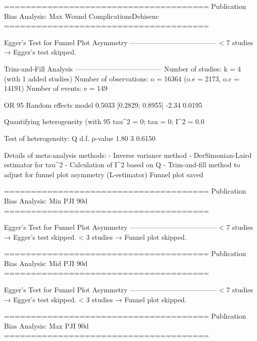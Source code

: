 ======================================
Publication Bias Analysis: Max Wound ComplicationsDehisenc 
======================================
                                                                                                                                                        
Egger's Test for Funnel Plot Asymmetry
--------------------------------------
  < 7 studies → Egger’s test skipped.

Trim-and-Fill Analysis
--------------------------------------
Number of studies: k = 4 (with 1 added studies)
Number of observations: o = 16364 (o.e = 2173, o.c = 14191)
Number of events: e = 149

                         OR           95%
Random effects model 0.5033 [0.2829; 0.8955] -2.34  0.0195

Quantifying heterogeneity (with 95%
 tau^2 = 0; tau = 0; I^2 = 0.0%

Test of heterogeneity:
    Q d.f. p-value
 1.80    3  0.6150

Details of meta-analysis methods:
- Inverse variance method
- DerSimonian-Laird estimator for tau^2
- Calculation of I^2 based on Q
- Trim-and-fill method to adjust for funnel plot asymmetry (L-estimator)
  Funnel plot saved
  
  
======================================
Publication Bias Analysis: Min PJI 90d 
======================================
                                                                                                                                                        
Egger's Test for Funnel Plot Asymmetry
--------------------------------------
  < 7 studies → Egger’s test skipped.
  < 3 studies → Funnel plot skipped.

======================================
Publication Bias Analysis: Mid PJI 90d 
======================================
                                                                                                                                                        
Egger's Test for Funnel Plot Asymmetry
--------------------------------------
  < 7 studies → Egger’s test skipped.
  < 3 studies → Funnel plot skipped.

======================================
Publication Bias Analysis: Max PJI 90d 
======================================
                                                                                                                                                        
